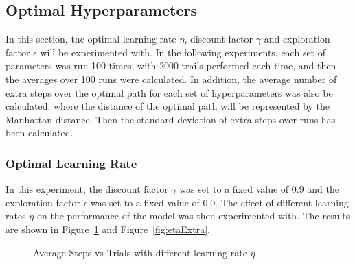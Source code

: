 \documentclass[conference]{IEEEtran}
\begin{document}
\subsection{Optimal Hyperparameters}

In this section, the optimal learning rate \({\eta}\), discount factor \({\gamma}\) and exploration factor \({\epsilon}\) will be experimented with. In the following experiments, each set of parameters was run 100 times, with 2000 trails performed each time, and then the averages over 100 runs were calculated. In addition, the average number of extra steps over the optimal path for each set of hyperparameters was also be calculated, where the distance of the optimal path will be represented by the Manhattan distance. Then the standard deviation of extra steps over runs has been calculated.

\subsubsection{Optimal Learning Rate}

In this experiment, the discount factor \({\gamma}\) was set to a fixed value of 0.9 and the exploration factor \({\epsilon}\) was set to a fixed value of 0.0. The effect of different learning rates \({\eta}\) on the performance of the model was then experimented with. The results are shown in Figure~\ref{fig:eta} and Figure~\ref{fig:etaExtra}.

\begin{figure}[!ht]
    \centering
    \caption{Average Steps vs Trials with different learning rate \({\eta}\)}\label{fig:eta}
\end{figure}
\end{document}
